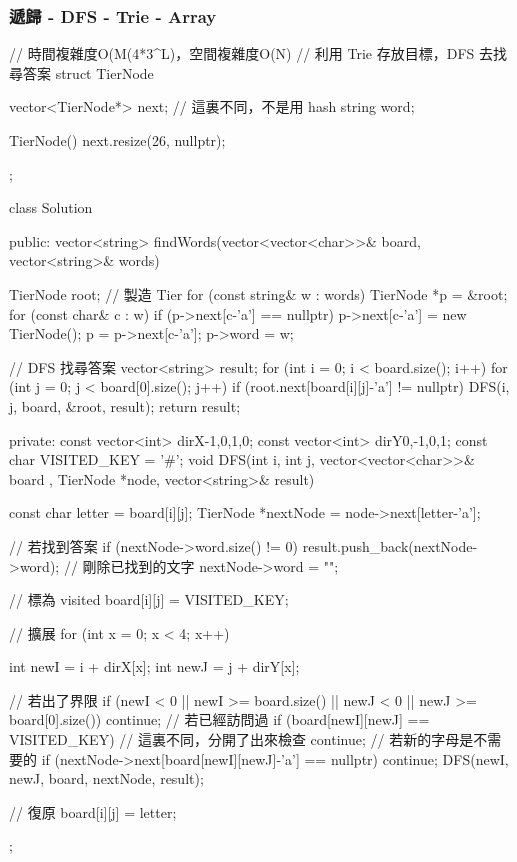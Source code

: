 \subsubsection{遞歸 - DFS - Trie - Array}
\begin{Code}
// 時間複雜度O(M(4*3^L)，空間複雜度O(N)
// 利用 Trie 存放目標，DFS 去找尋答案
struct TierNode
{
    vector<TierNode*> next; // 這裏不同，不是用 hash
    string word;

    TierNode()
    {
        next.resize(26, nullptr);
    }
};

class Solution {
public:
    vector<string> findWords(vector<vector<char>>& board, vector<string>& words) {
        TierNode root;
        // 製造 Tier
        for (const string& w : words)
        {
            TierNode *p = &root;
            for (const char& c : w)
            {
                if (p->next[c-'a'] == nullptr)
                    p->next[c-'a'] = new TierNode();
                p = p->next[c-'a'];
            }
            p->word = w;
        }

        // DFS 找尋答案
        vector<string> result;
        for (int i = 0; i < board.size(); i++)
        {
            for (int j = 0; j < board[0].size(); j++)
            {
                if (root.next[board[i][j]-'a'] != nullptr)
                    DFS(i, j, board, &root, result);
            }
        }
        return result;
    }
private:
    const vector<int> dirX{-1,0,1,0};
    const vector<int> dirY{0,-1,0,1};
    const char VISITED_KEY = '#';
    void DFS(int i, int j, vector<vector<char>>& board
             , TierNode *node, vector<string>& result)
    {
        const char letter = board[i][j];
        TierNode *nextNode = node->next[letter-'a'];

        // 若找到答案
        if (nextNode->word.size() != 0)
        {
            result.push_back(nextNode->word);
            // 剛除已找到的文字
            nextNode->word = "";
        }

        // 標為 visited
        board[i][j] = VISITED_KEY;

        // 擴展
        for (int x = 0; x < 4; x++)
        {
            int newI = i + dirX[x];
            int newJ = j + dirY[x];

            // 若出了界限
            if (newI < 0 || newI >= board.size() || newJ < 0 || newJ >= board[0].size())
                continue;
            // 若已經訪問過
            if (board[newI][newJ] == VISITED_KEY) // 這裏不同，分開了出來檢查
                continue;
            // 若新的字母是不需要的
            if (nextNode->next[board[newI][newJ]-'a'] == nullptr)
                continue;
            DFS(newI, newJ, board, nextNode, result);
        }

        // 復原
        board[i][j] = letter;
    }
};
\end{Code}


